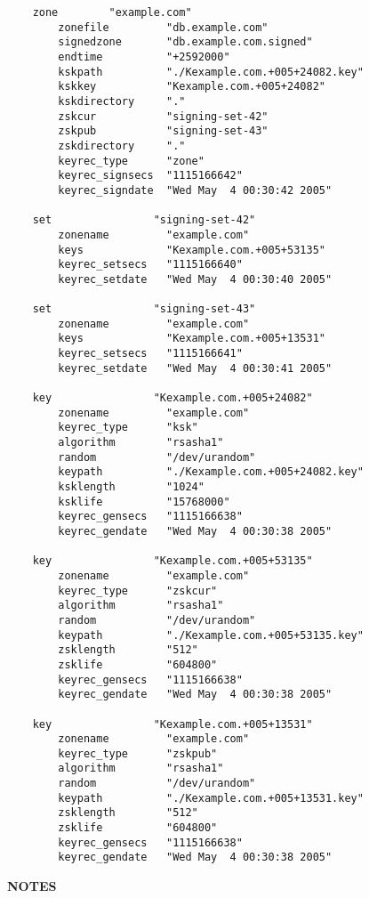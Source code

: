 \begin{verbatim}
    zone        "example.com"
        zonefile         "db.example.com"
        signedzone       "db.example.com.signed"
        endtime          "+2592000"
        kskpath          "./Kexample.com.+005+24082.key"
        kskkey           "Kexample.com.+005+24082"
        kskdirectory     "."
        zskcur           "signing-set-42"
        zskpub           "signing-set-43"
        zskdirectory     "."
        keyrec_type      "zone"
        keyrec_signsecs  "1115166642"
        keyrec_signdate  "Wed May  4 00:30:42 2005"

    set                "signing-set-42"
        zonename         "example.com"
        keys             "Kexample.com.+005+53135"
        keyrec_setsecs   "1115166640"
        keyrec_setdate   "Wed May  4 00:30:40 2005"

    set                "signing-set-43"
        zonename         "example.com"
        keys             "Kexample.com.+005+13531"
        keyrec_setsecs   "1115166641"
        keyrec_setdate   "Wed May  4 00:30:41 2005"

    key                "Kexample.com.+005+24082"
        zonename         "example.com"
        keyrec_type      "ksk"
        algorithm        "rsasha1"
        random           "/dev/urandom"
        keypath          "./Kexample.com.+005+24082.key"
        ksklength        "1024"
        ksklife          "15768000"
        keyrec_gensecs   "1115166638"
        keyrec_gendate   "Wed May  4 00:30:38 2005"

    key                "Kexample.com.+005+53135"
        zonename         "example.com"
        keyrec_type      "zskcur"
        algorithm        "rsasha1"
        random           "/dev/urandom"
        keypath          "./Kexample.com.+005+53135.key"
        zsklength        "512"
        zsklife          "604800"
        keyrec_gensecs   "1115166638"
        keyrec_gendate   "Wed May  4 00:30:38 2005"

    key                "Kexample.com.+005+13531"
        zonename         "example.com"
        keyrec_type      "zskpub"
        algorithm        "rsasha1"
        random           "/dev/urandom"
        keypath          "./Kexample.com.+005+13531.key"
        zsklength        "512"
        zsklife          "604800"
        keyrec_gensecs   "1115166638"
        keyrec_gendate   "Wed May  4 00:30:38 2005"
\end{verbatim}


{\bf NOTES}

